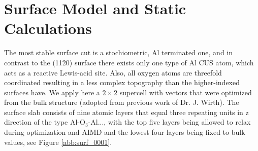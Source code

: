 \documentclass[11pt,DIV=13,BCOR=5mm,a4paper,headinclude]{scrbook}
\begin{document}
\section{Surface Model and Static Calculations}\label{sec_0001surf}
The most stable surface cut is a stochiometric, Al terminated one, and in contrast to the (11\=20) surface there exists only one type of Al CUS atom, which acts as a reactive Lewis-acid site.
Also, all oxygen atoms are threefold coordinated resulting in a less complex topography than the higher-indexed surfaces have.
We apply here a $2\times 2$ supercell with vectors that were optimized from the bulk structure (adopted from previous work of Dr. J. Wirth\cite{WirthJPCC2012}).
The surface slab consists of nine atomic layers that equal three repeating units in z direction of the type Al-O$_3$-Al..., with the top five layers being allowed to relax during optimization and AIMD and the lowest four layers being fixed to bulk values, see Figure \ref{abb:surf_0001}.
\end{document}
